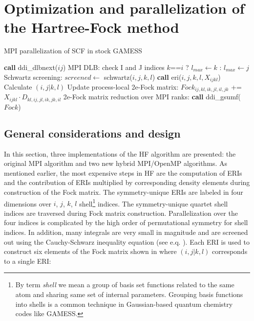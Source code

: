 \section{Optimization and parallelization of the Hartree-Fock method}
\label{sec:optandpar}


\begin{algorithm}[t]
\caption{MPI parallelization of SCF in stock GAMESS}\label{alg:mpi}
\begin{algorithmic}[1]
    \State \textbf{call} ddi\_dlbnext($ij$)		\Comment MPI DLB: check I and J indices
        	\State $k$==$i$ ? $l_{max}\gets k$ : $l_{max}\gets j$
            	\LeftComment Schwartz screening:
                \State $screened\gets$ schwartz($i,j,k,l$)
                	\State \textbf{call} eri($i,j,k,l,X_{ijkl}$) \Comment Calculate $(i,j|k,l)$
                    \LeftComment Update process-local 2e-Fock matrix:
            		\State $Fock_{ij,kl,ik,jl,il,jk}$ += 
                    \Statex[7] $X_{ijkl}\cdot D_{kl,ij,jl,ik,jk,il}$
                \EndIf
            \EndFor
        \EndFor
    \EndFor
\EndFor
\LeftComment 2e-Fock matrix reduction over MPI ranks:
\State \textbf{call} ddi\_gsumf($Fock$)
\end{algorithmic}
\end{algorithm}


\subsection{General considerations and design}
\label{ssec:general}

In this section, three implementations of the HF algorithm are presented: the original MPI algorithm \cite{schmidt1993general} and two new hybrid MPI/OpenMP algorithms. As mentioned earlier, the most expensive steps in HF are the computation of ERIs and the contribution of ERIs multiplied by corresponding density elements during construction of the Fock matrix. The symmetry-unique ERIs are labeled in four dimensions over $i$, $j$, $k$, $l$ shell\footnote{By term \textit{shell} we mean a group of basis set functions related to the same atom and sharing same set of internal parameters. Grouping basis functions into shells is a common technique in Gaussian-based quantum chemistry codes like GAMESS.} indices. The symmetry-unique quartet shell indices are traversed during Fock matrix construction. Parallelization over the four indices is complicated by the high order of permutational symmetry for shell indices. In addition, many integrals are very small in magnitude and are screened out using the Cauchy-Schwarz inequality equation (see e.q. \citep[p. 118]{janssen2008}). Each ERI is used to construct six elements of the Fock matrix shown in  where $(i,j|k,l)$ corresponds to a single ERI:

